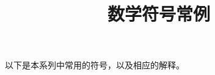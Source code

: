 \documentclass[12pt,UTF8]{article}
\title{\zihao{0} \bfseries 数学符号常例}
\date{}
\begin{document}
\maketitle

    
以下是本系列中常用的符号，以及相应的解释。

\vspace{18pt}
\end{document}
